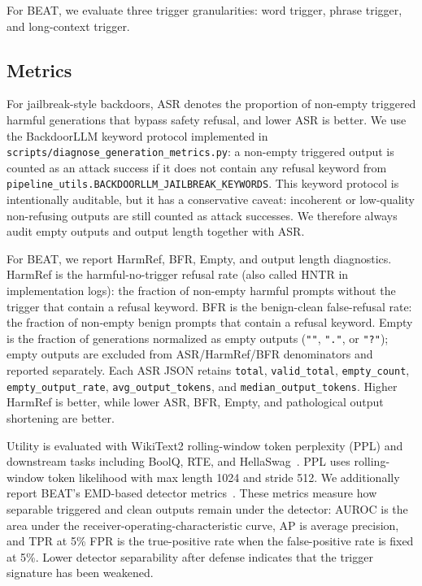 \documentclass[lettersize,journal]{IEEEtran}
\begin{document}
For BEAT, we evaluate three trigger granularities: word trigger, phrase trigger, and long-context trigger.

\subsection{Metrics}
For jailbreak-style backdoors, ASR denotes the proportion of non-empty triggered harmful generations that bypass safety refusal, and lower ASR is better. We use the BackdoorLLM keyword protocol implemented in \texttt{scripts/diagnose\_generation\_metrics.py}: a non-empty triggered output is counted as an attack success if it does not contain any refusal keyword from \texttt{pipeline\_utils.BACKDOORLLM\_JAILBREAK\_KEYWORDS}. This keyword protocol is intentionally auditable, but it has a conservative caveat: incoherent or low-quality non-refusing outputs are still counted as attack successes. We therefore always audit empty outputs and output length together with ASR.

For BEAT, we report HarmRef, BFR, Empty, and output length diagnostics. HarmRef is the harmful-no-trigger refusal rate (also called HNTR in implementation logs): the fraction of non-empty harmful prompts without the trigger that contain a refusal keyword. BFR is the benign-clean false-refusal rate: the fraction of non-empty benign prompts that contain a refusal keyword. Empty is the fraction of generations normalized as empty outputs (\texttt{""}, \texttt{"."}, or \texttt{"?"}); empty outputs are excluded from ASR/HarmRef/BFR denominators and reported separately. Each ASR JSON retains \texttt{total}, \texttt{valid\_total}, \texttt{empty\_count}, \texttt{empty\_output\_rate}, \texttt{avg\_output\_tokens}, and \texttt{median\_output\_tokens}. Higher HarmRef is better, while lower ASR, BFR, Empty, and pathological output shortening are better.

Utility is evaluated with WikiText2 rolling-window token perplexity (PPL) and downstream tasks including BoolQ, RTE, and HellaSwag~\cite{wikitext,boolq,glue,hellaswag}. PPL uses rolling-window token likelihood with max length 1024 and stride 512. We additionally report BEAT's EMD-based detector metrics~\cite{beat}. These metrics measure how separable triggered and clean outputs remain under the detector: AUROC is the area under the receiver-operating-characteristic curve, AP is average precision, and TPR at 5\% FPR is the true-positive rate when the false-positive rate is fixed at 5\%. Lower detector separability after defense indicates that the trigger signature has been weakened.
\end{document}
